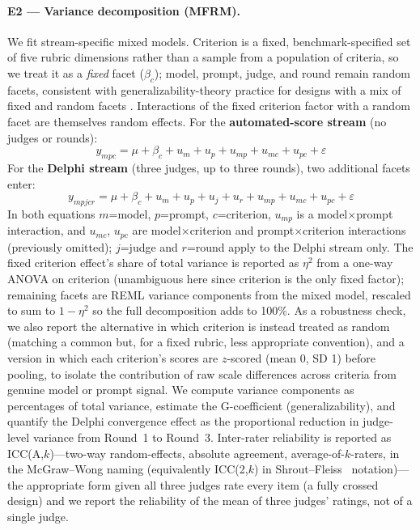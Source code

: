 \documentclass[10pt]{article}
\begin{document}
\paragraph{E2 — Variance decomposition (MFRM).}
We fit stream-specific mixed models. Criterion is a fixed, benchmark-specified
set of five rubric dimensions rather than a sample from a population of
criteria, so we treat it as a \emph{fixed} facet ($\beta_c$); model, prompt,
judge, and round remain random facets, consistent with generalizability-theory
practice for designs with a mix of fixed and random facets
\citep[e.g.,][]{cronbach1972,brennan2001}. Interactions of the fixed criterion
factor with a random facet are themselves random effects.
For the \textbf{automated-score stream} (no judges or rounds):
\[
y_{mpc} = \mu + \beta_c + u_m + u_p + u_{mp} + u_{mc} + u_{pc} + \varepsilon
\]
For the \textbf{Delphi stream} (three judges, up to three rounds),
two additional facets enter:
\[
y_{mpjcr} = \mu + \beta_c + u_m + u_p + u_j + u_r + u_{mp} + u_{mc} + u_{pc} + \varepsilon
\]
In both equations $m$=model, $p$=prompt, $c$=criterion, $u_{mp}$ is a
model$\times$prompt interaction, and $u_{mc}$, $u_{pc}$ are
model$\times$criterion and prompt$\times$criterion interactions (previously
omitted); $j$=judge and $r$=round apply to the Delphi stream only.
The fixed criterion effect's share of total variance is reported as $\eta^2$
from a one-way ANOVA on criterion (unambiguous here since criterion is the
only fixed factor); remaining facets are REML variance components from the
mixed model, rescaled to sum to $1-\eta^2$ so the full decomposition adds to
100\%. As a robustness check, we also report the alternative in which
criterion is instead treated as random (matching a common but, for a fixed
rubric, less appropriate convention), and a version in which each criterion's
scores are $z$-scored (mean 0, SD 1) before pooling, to isolate the
contribution of raw scale differences across criteria from genuine model or
prompt signal.
We compute variance components as percentages of total variance, estimate
the G-coefficient (generalizability), and quantify the Delphi convergence
effect as the proportional reduction in judge-level variance from Round~1
to Round~3.
Inter-rater reliability is reported as ICC(A,$k$)---two-way random-effects,
absolute agreement, average-of-$k$-raters, in the McGraw--Wong
\citep{mcgraw1996} naming (equivalently ICC(2,$k$) in
Shrout--Fleiss~\citeyearpar{shrout1979} notation)---the appropriate form
given all three judges rate every item (a fully crossed design) and we
report the reliability of the mean of three judges' ratings, not of a
single judge.
\end{document}
